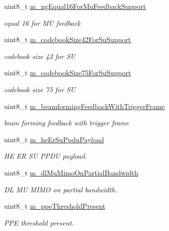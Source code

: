 \begin{DoxyCompactItemize}
uint8\+\_\+t \hyperlink{classns3_1_1HeCapabilities_a8c25e39d6fdc4bf46195a8a3ac792e39}{m\+\_\+ng\+Equal16\+For\+Mu\+Feedback\+Support}
\begin{DoxyCompactList}\small\item\em equal 16 for MU feedback \end{DoxyCompactList}\item 
uint8\+\_\+t \hyperlink{classns3_1_1HeCapabilities_a6813b518a042be5630eca7176ef38edc}{m\+\_\+codebook\+Size42\+For\+Su\+Support}
\begin{DoxyCompactList}\small\item\em codebook size 42 for SU \end{DoxyCompactList}\item 
uint8\+\_\+t \hyperlink{classns3_1_1HeCapabilities_ad20d30c4b5e5916a9d5ddc1dd9974ab3}{m\+\_\+codebook\+Size75\+For\+Su\+Support}
\begin{DoxyCompactList}\small\item\em codebook size 75 for SU \end{DoxyCompactList}\item 
uint8\+\_\+t \hyperlink{classns3_1_1HeCapabilities_a67342083f99cbe908d4bc37499f07830}{m\+\_\+beamforming\+Feedback\+With\+Trigger\+Frame}
\begin{DoxyCompactList}\small\item\em beam forming feedback with trigger frame \end{DoxyCompactList}\item 
uint8\+\_\+t \hyperlink{classns3_1_1HeCapabilities_a10a1a090e7132b4e1e9eb2977ced7cfa}{m\+\_\+he\+Er\+Su\+Ppdu\+Payload}
\begin{DoxyCompactList}\small\item\em HE ER SU P\+P\+DU payload. \end{DoxyCompactList}\item 
uint8\+\_\+t \hyperlink{classns3_1_1HeCapabilities_aac23f94dbf47c9c855089ebbef9637e3}{m\+\_\+dl\+Mu\+Mimo\+On\+Partial\+Bandwidth}
\begin{DoxyCompactList}\small\item\em DL MU M\+I\+MO on partial bandwidth. \end{DoxyCompactList}\item 
uint8\+\_\+t \hyperlink{classns3_1_1HeCapabilities_ab1fa615dfa8a62f7080232e58dbde1c0}{m\+\_\+ppe\+Threshold\+Present}
\begin{DoxyCompactList}\small\item\em P\+PE threshold present. \end{DoxyCompactList}\item 

\end{DoxyCompactItemize}
